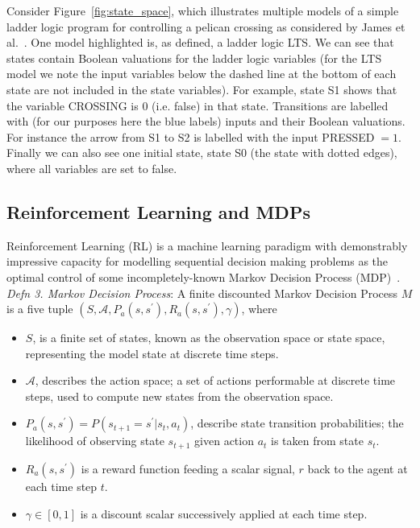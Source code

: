 \documentclass[runningheads]{llncs}
\begin{document}
Consider Figure~\ref{fig:state_space}, which illustrates multiple models of a simple ladder logic program for controlling a pelican crossing as considered by James et al.~\cite{james2013verification}. One model highlighted is, as defined, a ladder logic LTS. We can see that states contain Boolean valuations for the ladder logic variables (for the LTS model we note the input variables below the dashed line at the bottom of each state are not included in the state variables). For example, state S1 shows that the variable CROSSING is $0$ (i.e. false) in that state. Transitions are labelled with (for our purposes here the blue labels) inputs and their Boolean valuations. For instance the arrow from S1 to S2 is labelled with the input PRESSED$\;=1$. Finally we can also see one initial state, state S0 (the state with dotted edges), where all variables are set to false.

\subsection{Reinforcement Learning and MDPs} 
Reinforcement Learning (RL) is a machine learning paradigm with demonstrably impressive capacity for modelling sequential decision making problems as the optimal control of some incompletely-known Markov Decision Process (MDP)~\cite{sutton2018reinforcement}. 
\textit{Defn 3. Markov Decision Process}: A finite discounted Markov Decision Process $M$ is a five tuple $(S,\mathcal{A},P_a(s,s^\prime), R_a(s,s^\prime),\gamma)$, where 
\begin{itemize}
	\item $S$, is a finite set of states, known as the observation space or state space, representing the model state at discrete time steps.
	\item $\mathcal{A}$, describes the action space; a set of actions performable at discrete time steps, used to compute new states from the observation space.
	\item $P_a(s,s^\prime) = P(s_{t+1} = s^\prime | s_t, a_t)$, describe state transition probabilities; the likelihood of observing state $s_{t+1}$ given action $a_t$ is taken from state $s_t$.
	\item $R_a(s,s^\prime)$ is a reward function feeding a scalar signal, $r$ back to the agent at each time step $t$. 
	\item $\gamma \in [0,1]$ is a discount scalar successively applied at each time step.
\end{itemize}
\end{document}
